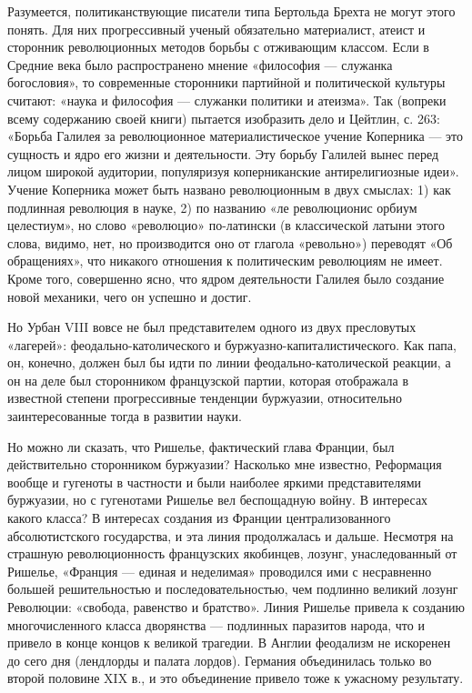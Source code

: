 Разумеется, политиканствующие писатели типа Бертольда Брехта не могут этого
понять. Для них прогрессивный ученый обязательно материалист, атеист и
сторонник революционных методов борьбы с отживающим классом. Если в Средние
века было распространено мнение «философия --- служанка богословия», то
современные сторонники партийной и политической культуры считают: «наука и
философия --- служанки политики и атеизма». Так (вопреки всему содержанию своей
книги) пытается изобразить дело и Цейтлин, с. 263: «Борьба Галилея за
революционное материалистическое учение Коперника --- это сущность и ядро его
жизни и деятельности. Эту борьбу Галилей вынес перед лицом широкой аудитории,
популяризуя коперниканские антирелигиозные идеи». Учение Коперника может быть
названо революционным в двух смыслах: 1) как подлинная революция в науке, 2) по
названию «ле революционис орбиум целестиум», но слово «революцио» по-латински
(в классической латыни этого слова, видимо, нет, но производится оно от глагола
«револьно») переводят «Об обращениях», что никакого отношения к политическим
революциям не имеет. Кроме того, совершенно ясно, что ядром деятельности
Галилея было создание новой механики, чего он успешно и достиг.

Но Урбан VIII вовсе не был представителем одного из двух пресловутых «лагерей»:
феодально-католического и буржуазно-капиталистического. Как папа, он, конечно,
должен был бы идти по линии феодально-католической реакции, а он на деле был
сторонником французской партии, которая отображала в известной степени
прогрессивные тенденции буржуазии, относительно заинтересованные тогда в
развитии науки.

Но можно ли сказать, что Ришелье, фактический глава Франции, был действительно
сторонником буржуазии? Насколько мне известно, Реформация вообще и гугеноты в
частности и были наиболее яркими представителями буржуазии, но с гугенотами
Ришелье вел беспощадную войну. В интересах какого класса? В интересах создания
из Франции централизованного абсолютистского государства, и эта линия
продолжалась и дальше. Несмотря на страшную революционность французских
якобинцев, лозунг, унаследованный от Ришелье, «Франция --- единая и неделимая»
проводился ими с несравненно большей решительностью и последовательностью, чем
подлинно великий лозунг Революции: «свобода, равенство и братство». Линия
Ришелье привела к созданию многочисленного класса дворянства --- подлинных
паразитов народа, что и привело в конце концов к великой трагедии. В Англии
феодализм не искоренен до сего дня (лендлорды и палата лордов). Германия
объединилась только во второй половине XIX в., и это объединение привело тоже к
ужасному результату.

